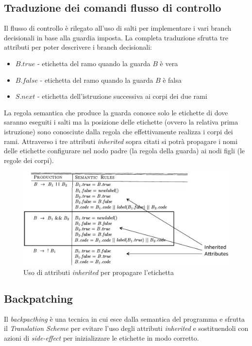 \subsection{Traduzione dei comandi flusso di controllo}
Il flusso di controllo \`e rilegato all'uso di salti per implementare i vari
branch decisionali in base alla guardia imposta. La completa traduzione sfrutta
tre attributi per poter descrivere i branch decisionali:
\begin{itemize}
\item $B.true$ - etichetta del ramo quando la guarda $B$ \`e vera
\item $B.false$ - etichetta del ramo quando la guarda $B$ \`e falsa
\item $S.next$ - etichetta dell'istruzione successiva ai corpi dei due rami
\end{itemize}

La regola semantica che produce la guarda conosce solo le etichette di dove
saranno eseguiti i salti ma la posizione delle etichette (ovvero la relativa
prima istruzione) sono conosciute dalla regola che effettivamente realizza i
corpi dei rami. Attraverso i tre attributi \textit{inherited} sopra citati si
potr\`a propagare i nomi delle etichette configurare nel nodo padre (la regola
della guarda) ai nodi figli (le regole dei corpi).

\begin{figure}[H]
  \centering
  \includegraphics[scale=0.5]{res/image/propagation_label}
  \caption{Uso di attributi \textit{inherited} per propagare l'etichetta}
  \label{img:propagation_label}
\end{figure}

\subsection{Backpatching}
Il \textit{backpacthing} \`e una tecnica in cui esce dalla semantica del
programma e sfrutta il \textit{Translation Scheme} per evitare l'uso degli
attributi \textit{inherited} e sostituendoli con azioni di \textit{side-effect}
per inizializzare le etichette in modo corretto.

